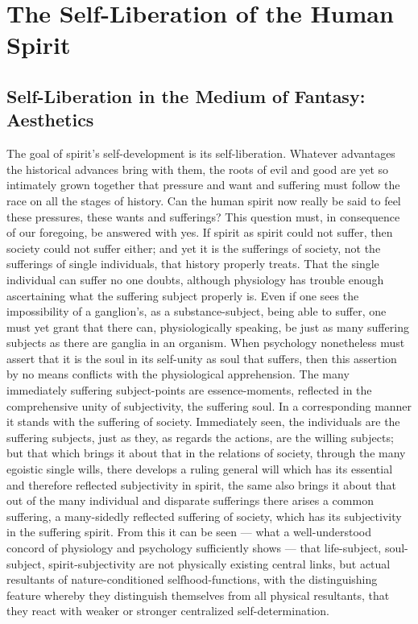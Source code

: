 \documentclass[12pt]{book}
\begin{document}
\chapter{The Self-Liberation of the Human Spirit}

\section{Self-Liberation in the Medium of Fantasy: Aesthetics}
\label{sec:23en}

\noindent The goal of spirit's self-development is its self-liberation. Whatever advantages
the historical advances bring with them, the roots of evil and good are yet so intimately
grown together that pressure and want and suffering must follow the race on all the stages of
history. Can the human spirit now really be said to feel these pressures, these wants and
sufferings? This question must, in consequence of our foregoing, be answered with yes. If
spirit as spirit could not suffer, then society could not suffer either; and yet it is the
sufferings of society, not the sufferings of single individuals, that history properly treats.
That the single individual can suffer no one doubts, although physiology has trouble enough
ascertaining what the suffering subject properly is. Even if one sees the impossibility of a
ganglion's, as a substance-subject, being able to suffer, one must yet grant that there can,
physiologically speaking, be just as many suffering subjects as there are ganglia in an
organism. When psychology nonetheless must assert that it is the soul in its self-unity as
soul that suffers, then this assertion by no means conflicts with the physiological
apprehension. The many immediately suffering subject-points are essence-moments, reflected in
the comprehensive unity of subjectivity, the suffering soul. In a corresponding manner it
stands with the suffering of society. Immediately seen, the individuals are the suffering
subjects, just as they, as regards the actions, are the willing subjects; but that which
brings it about that in the relations of society, through the many egoistic single wills, there
develops a ruling general will which has its essential and therefore reflected subjectivity in
spirit, the same also brings it about that out of the many individual and disparate sufferings
there arises a common suffering, a many-sidedly reflected suffering of society, which has its
subjectivity in the suffering spirit. From this it can be seen --- what a well-understood
concord of physiology and psychology sufficiently shows --- that life-subject, soul-subject,
spirit-subjectivity are not physically existing central links, but actual resultants of
nature-conditioned selfhood-functions, with the distinguishing feature whereby they
distinguish themselves from all physical resultants, that they react with weaker or stronger
centralized self-determination.
\end{document}
